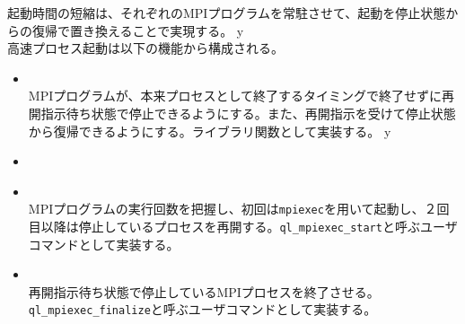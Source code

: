 \documentclass[twoside,11pt,fleqn]{book}
\begin{document}
起動時間の短縮は、それぞれのMPIプログラムを常駐させて、起動を停止状態からの復帰で置き換えることで実現する。
\ifx \HLDIFFAUG y
\\
\fi
高速プロセス起動は以下の機能から構成される。
\begin{itemize}
\item {}\\
MPIプログラムが、本来プロセスとして終了するタイミングで終了せずに再開指示待ち状態で停止できるようにする。また、再開指示を受けて停止状態から復帰できるようにする。ライブラリ関数として実装する。
\ifx \HLDIFFAUG y
\item {}\\
\fi
\item {}\\
MPIプログラムの実行回数を把握し、初回は\texttt{mpiexec}を用いて起動し、２回目以降は停止しているプロセスを再開する。\texttt{ql\_mpiexec\_start}と呼ぶユーザコマンドとして実装する。
\item {}\\
再開指示待ち状態で停止しているMPIプロセスを終了させる。\texttt{ql\_mpiexec\_finalize}と呼ぶユーザコマンドとして実装する。
\end{itemize}
\end{document}

